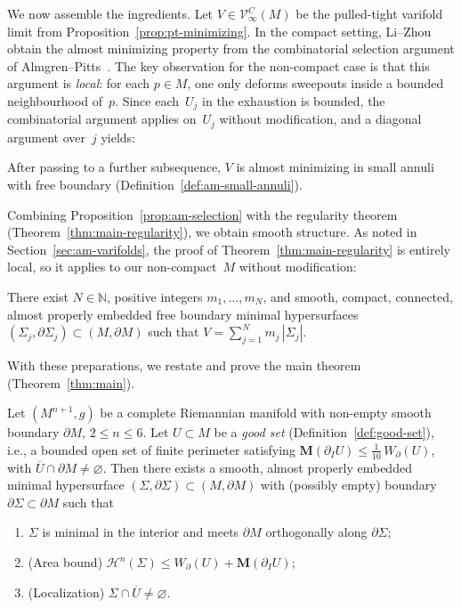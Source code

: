 We now assemble the ingredients. Let $V\in\mathcal{V}^C_\infty(M)$ be the pulled-tight varifold limit from Proposition~\ref{prop:pt-minimizing}. In the compact setting, Li--Zhou~\cite[Theorem~5.3]{LZ17} obtain the almost minimizing property from the combinatorial selection argument of Almgren--Pitts~\cite{Pit81}. The key observation for the non-compact case is that this argument is \emph{local}: for each $p\in M$, one only deforms sweepouts inside a bounded neighbourhood of~$p$. Since each~$U_j$ in the exhaustion is bounded, the combinatorial argument applies on~$U_j$ without modification, and a diagonal argument over~$j$ yields:

\begin{proposition}\label{prop:am-selection}
After passing to a further subsequence, $V$ is almost minimizing in small annuli with free boundary (Definition~\ref{def:am-small-annuli}).
\end{proposition}

Combining Proposition~\ref{prop:am-selection} with the regularity theorem (Theorem~\ref{thm:main-regularity}), we obtain smooth structure. As noted in Section~\ref{sec:am-varifolds}, the proof of Theorem~\ref{thm:main-regularity} is entirely local, so it applies to our non-compact~$M$ without modification:

\begin{proposition}\label{prop:regular-limit}
There exist $N\in\mathbb{N}$, positive integers $m_1,\ldots,m_N$, and smooth, compact, connected, almost properly embedded free boundary minimal hypersurfaces $(\Sigma_j,\partial\Sigma_j)\subset (M,\partial M)$ such that $V=\sum_{j=1}^N m_j\,|\Sigma_j|$.
\end{proposition}

With these preparations, we restate and prove the main theorem (Theorem~\ref{thm:main}).

\begin{theorem}\label{thm:main-complete}
Let $(M^{n+1}, g)$ be a complete Riemannian manifold with non-empty smooth boundary $\partial M$, $2 \leq n \leq 6$.  Let $U \subset M$ be a \emph{good set} (Definition~\ref{def:good-set}), i.e., a bounded open set of finite perimeter satisfying $\mathbf{M}(\partial_I U) \leq \frac{1}{10}\, W_\partial(U)$, with $\overline{U} \cap \partial M \neq \varnothing$.  Then there exists a smooth, almost properly embedded minimal hypersurface $(\Sigma,\partial\Sigma)\subset(M,\partial M)$ with (possibly empty) boundary $\partial\Sigma\subset\partial M$ such that
\begin{enumerate}[label=\textup{(\roman*)}]
    \item $\Sigma$ is minimal in the interior and meets $\partial M$ orthogonally along $\partial\Sigma$;
    \item \textup{(Area bound)} $\mathcal{H}^n(\Sigma)\le W_\partial(U)+\mathbf{M}(\partial_IU)$;
    \item \textup{(Localization)} $\Sigma\cap\overline{U}\neq\varnothing$.
\end{enumerate}
\end{theorem}

